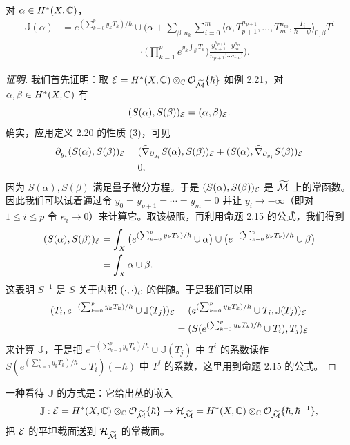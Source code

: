 \begin{proposition}
对 $\alpha\in H^*(X,\mathbb{C})$，
\begin{align*}
\mathbb{J}(\alpha) &= e^{(\sum_{k=0}^p y_kT_k)/\hbar}\cup\Big(\alpha+\sum_{\beta,n_k}\sum_{i=0}^m\Big\langle\alpha,T_{p+1}^{n_{p+1}},\dots,T_m^{n_m},\frac{T_i}{\hbar-\psi}\Big\rangle_{0,\beta}T^i\\
&\qquad\qquad\qquad\qquad\cdot\Big(\prod_{k=1}^p e^{y_k\int_\beta T_k}\Big)\frac{y_{p+1}^{n_{p+1}}\cdots y_m^{n_m}}{n_{p+1}!\cdots n_m!}\Big).
\end{align*}
\end{proposition}

\begin{proof}[证明]
我们首先证明：取 $\mathcal{E}=H^*(X,\mathbb{C})\otimes_{\mathbb{C}}\mathcal{O}_{\widetilde{\mathcal{M}}}\{\hbar\}$ 如例 2.21，对 $\alpha,\beta\in H^*(X,\mathbb{C})$ 有
\[
(S(\alpha),S(\beta))_{\mathcal{E}}=(\alpha,\beta)_{\mathcal{E}}.
\]
确实，应用定义 2.20 的性质 (3)，可见
\begin{align*}
\partial_{y_i}(S(\alpha),S(\beta))_{\mathcal{E}} &= (\widehat{\nabla}_{\partial_{y_i}}S(\alpha),S(\beta))_{\mathcal{E}}+(S(\alpha),\widehat{\nabla}_{\partial_{y_i}}S(\beta))_{\mathcal{E}}\\
&= 0,
\end{align*}
因为 $S(\alpha),S(\beta)$ 满足量子微分方程。于是 $(S(\alpha),S(\beta))_{\mathcal{E}}$ 是 $\widetilde{\mathcal{M}}$ 上的常函数。因此我们可以试着通过令 $y_0=y_{p+1}=\cdots=y_m=0$ 并让 $y_i\to-\infty$（即对 $1\le i\le p$ 令 $\kappa_i\to0$）来计算它。取该极限，再利用命题 2.15 的公式，我们得到
\begin{align*}
(S(\alpha),S(\beta))_{\mathcal{E}} &= \int_X \big(e^{(\sum_{k=0}^p y_kT_k)/\hbar}\cup\alpha\big)\cup\big(e^{-(\sum_{k=0}^p y_kT_k)/\hbar}\cup\beta\big)\\
&= \int_X \alpha\cup\beta.
\end{align*}
这表明 $S^{-1}$ 是 $S$ 关于内积 $(\cdot,\cdot)_{\mathcal{E}}$ 的伴随。于是我们可以用
\begin{align*}
(T_i,e^{-(\sum_{k=0}^p y_kT_k)/\hbar}\cup\mathbb{J}(T_j))_{\mathcal{E}} &= (e^{(\sum_{k=0}^p y_kT_k)/\hbar}\cup T_i,\mathbb{J}(T_j))_{\mathcal{E}}\\
&= (S(e^{(\sum_{k=0}^p y_kT_k)/\hbar}\cup T_i),T_j)_{\mathcal{E}}
\end{align*}
来计算 $\mathbb{J}$，于是把 $e^{-(\sum_{k=0}^p y_kT_k)/\hbar}\cup\mathbb{J}(T_j)$ 中 $T^i$ 的系数读作 $S(e^{(\sum_{k=0}^p y_kT_k)/\hbar}\cup T_i)(-\hbar)$ 中 $T^j$ 的系数，这里用到命题 2.15 的公式。
\end{proof}

一种看待 $\mathbb{J}$ 的方式是：它给出丛的嵌入
\[
\mathbb{J}:\mathcal{E}=H^*(X,\mathbb{C})\otimes_{\mathbb{C}}\mathcal{O}_{\widetilde{\mathcal{M}}}\{\hbar\}\to\mathcal{H}_{\widetilde{\mathcal{M}}}=H^*(X,\mathbb{C})\otimes_{\mathbb{C}}\mathcal{O}_{\widetilde{\mathcal{M}}}\{\hbar,\hbar^{-1}\},
\]
把 $\mathcal{E}$ 的平坦截面送到 $\mathcal{H}_{\widetilde{\mathcal{M}}}$ 的常截面。

